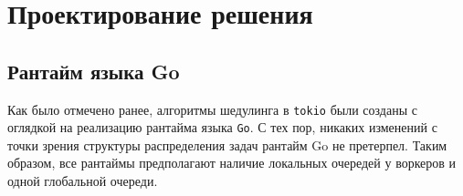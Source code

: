 
\section{Проектирование решения}

\subsection{Рантайм языка Go}

Как было отмечено ранее, алгоритмы шедулинга в \verb|tokio| были созданы с оглядкой на реализацию рантайма языка \verb|Go|. С тех пор, никаких изменений с точки зрения структуры распределения задач рантайм Go не претерпел. Таким образом, все рантаймы предполагают наличие локальных очередей у воркеров и одной глобальной очереди.
